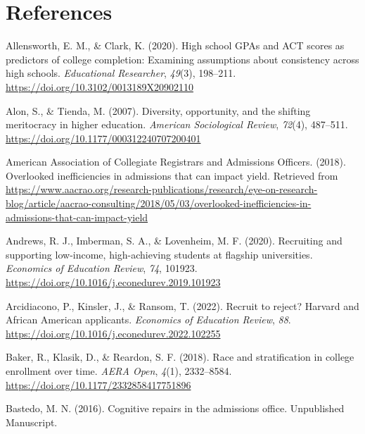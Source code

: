 \documentclass[
  12pt,
]{article}
\newlength{\cslhangindent}
\newlength{\cslentryspacingunit} %
\newenvironment{CSLReferences}[2] %
 {%
  \setlength{\parindent}{0pt}
  \ifodd #1
  \let\oldpar\par
  \def\par{\hangindent=\cslhangindent\oldpar}
  \fi
  \setlength{\parskip}{#2\cslentryspacingunit}
 }%
 {}
\begin{document}
\hypertarget{references}{%
\section{References}\label{references}}

\singlespacing

\hypertarget{refs}{}
\begin{CSLReferences}{1}{0}
\leavevmode{}%
Allensworth, E. M., \& Clark, K. (2020). High school GPAs and ACT scores as predictors of college completion: Examining assumptions about consistency across high schools. \emph{Educational Researcher}, \emph{49}(3), 198--211. \url{https://doi.org/10.3102/0013189X20902110}

\leavevmode{}%
Alon, S., \& Tienda, M. (2007). Diversity, opportunity, and the shifting meritocracy in higher education. \emph{American Sociological Review}, \emph{72}(4), 487--511. \url{https://doi.org/10.1177/000312240707200401}

\leavevmode{}%
American Association of Collegiate Registrars and Admissions Officers. (2018). Overlooked inefficiencies in admissions that can impact yield. Retrieved from \url{https://www.aacrao.org/research-publications/research/eye-on-research-blog/article/aacrao-consulting/2018/05/03/overlooked-inefficiencies-in-admissions-that-can-impact-yield}

\leavevmode{}%
Andrews, R. J., Imberman, S. A., \& Lovenheim, M. F. (2020). Recruiting and supporting low-income, high-achieving students at flagship universities. \emph{Economics of Education Review}, \emph{74}, 101923. \url{https://doi.org/10.1016/j.econedurev.2019.101923}

\leavevmode{}%
Arcidiacono, P., Kinsler, J., \& Ransom, T. (2022). Recruit to reject? Harvard and {A}frican {A}merican applicants. \emph{Economics of Education Review}, \emph{88}. \url{https://doi.org/10.1016/j.econedurev.2022.102255}

\leavevmode{}%
Baker, R., Klasik, D., \& Reardon, S. F. (2018). Race and stratification in college enrollment over time. \emph{AERA Open}, \emph{4}(1), 2332--8584. \url{https://doi.org/10.1177/2332858417751896}

\leavevmode{}%
Bastedo, M. N. (2016). Cognitive repairs in the admissions office. Unpublished Manuscript.


\end{CSLReferences}
\end{document}

